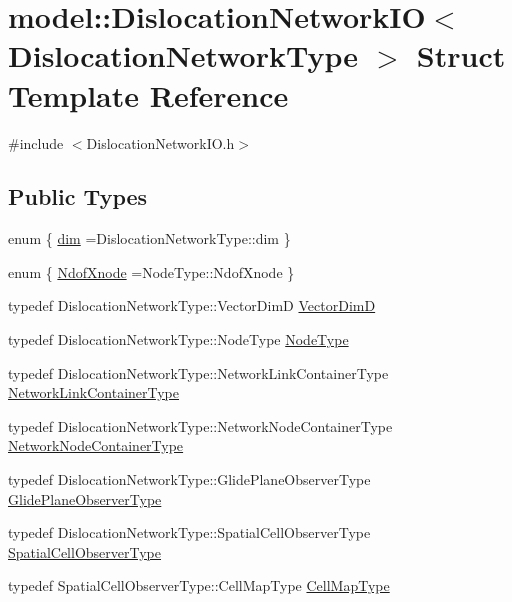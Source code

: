 \hypertarget{structmodel_1_1_dislocation_network_i_o}{}\section{model\+:\+:Dislocation\+Network\+I\+O$<$ Dislocation\+Network\+Type $>$ Struct Template Reference}
\label{structmodel_1_1_dislocation_network_i_o}


{\ttfamily \#include $<$Dislocation\+Network\+I\+O.\+h$>$}

\subsection*{Public Types}
\begin{DoxyCompactItemize}
\item 
enum \{ \hyperlink{structmodel_1_1_dislocation_network_i_o_afebd5810a8f781fc5f1356f0cf3686e6a5050bb137fe63ff3d177471c58326223}{dim} =Dislocation\+Network\+Type\+:\+:dim
 \}
\item 
enum \{ \hyperlink{structmodel_1_1_dislocation_network_i_o_aa8ad28f2a51e326f2af17078baf5a640ad3e208a5afeac025d2e479ff844c32f1}{Ndof\+Xnode} =Node\+Type\+:\+:Ndof\+Xnode
 \}
\item 
typedef Dislocation\+Network\+Type\+::\+Vector\+Dim\+D \hyperlink{structmodel_1_1_dislocation_network_i_o_aecfb7f1c25d54991dff328deed306f35}{Vector\+Dim\+D}
\item 
typedef Dislocation\+Network\+Type\+::\+Node\+Type \hyperlink{structmodel_1_1_dislocation_network_i_o_a33463e36c65dfbad3e7f656a83e6ac58}{Node\+Type}
\item 
typedef Dislocation\+Network\+Type\+::\+Network\+Link\+Container\+Type \hyperlink{structmodel_1_1_dislocation_network_i_o_a9b6f8cbe67a3cda440575dfb86995fff}{Network\+Link\+Container\+Type}
\item 
typedef Dislocation\+Network\+Type\+::\+Network\+Node\+Container\+Type \hyperlink{structmodel_1_1_dislocation_network_i_o_aaf3c85244251a934db165b29f0319e6d}{Network\+Node\+Container\+Type}
\item 
typedef Dislocation\+Network\+Type\+::\+Glide\+Plane\+Observer\+Type \hyperlink{structmodel_1_1_dislocation_network_i_o_aa36bea0cc57a8e50cf51a19f41726567}{Glide\+Plane\+Observer\+Type}
\item 
typedef Dislocation\+Network\+Type\+::\+Spatial\+Cell\+Observer\+Type \hyperlink{structmodel_1_1_dislocation_network_i_o_aee96cf0b487c398eea34559c3aa873bf}{Spatial\+Cell\+Observer\+Type}
\item 
typedef Spatial\+Cell\+Observer\+Type\+::\+Cell\+Map\+Type \hyperlink{structmodel_1_1_dislocation_network_i_o_af2ad1c2da5b8cd4a65070f03ccf1f05d}{Cell\+Map\+Type}
\end{DoxyCompactItemize}
